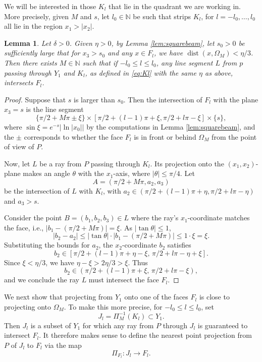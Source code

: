 \documentclass[11pt]{amsart}
\newtheorem{lemma}[theorem]{Lemma}
\numberwithin{equation}{section}
\theoremstyle{definition}
\theoremstyle{definition}
\theoremstyle{definition}
\newcommand{\N}{\mathbb{N}}
\begin{document}
We will be interested in those $K_l$ that lie in the quadrant we are working in. More precisely, given $M$ and $s$, let $l_0 \in \N$ be such that strips $K_l$, for $l=-l_0,\ldots, l_0$ all lie in the region $x_1 > |x_2|$.

\begin{lemma}\label{intersection-lemma}
Let $\delta>0$. Given $\eta>0$, by Lemma \ref{lem:squarebeam}, let $s_0>0$ be sufficiently large that for $x_3>s_0$ and any $x\in F_l$, we have $\operatorname{dist}(x,\Omega_M) < \eta/3$. Then there exists $M\in \N$ such that if $-l_0 \leq l \leq l_0$, any line segment $L$ from $p$ passing through $Y_1$ and $K_l$, as defined in \eqref{eq:Kl} with the same $\eta$ as above, intersects $F_l$.
\end{lemma}

\begin{proof}
Suppose that $s$ is larger than $s_0$. Then the intersection of $F_l$ with the plane $x_3 = s$ is the line segment
\[
\{\pi/2 + M\pi \pm \xi\} \times [\pi/2 + (l-1)\pi + \xi, \pi/2 + l\pi - \xi] \times \{s\},
\]
where $\sin \xi = e^{-s} |\ln |x_0||$ by the computations in Lemma \ref{lem:squarebeam}, and the $\pm$ corresponds to whether the face $F_l$ is in front or behind $\Omega_M$ from the point of view of $P$.

Now, let $L$ be a ray from $P$ passing through $K_l$. Its projection onto the $(x_1,x_2)$-plane makes an angle $\theta$ with  the $x_1$-axis, where $|\theta| \le \pi/4$. Let
\[
A = (\pi/2 + M\pi , a_2, a_3)
\]
be the intersection of $L$ with $K_l$, with $a_2 \in (\pi/2 + (l-1)\pi + \eta, \pi/2 + l\pi - \eta)$ and $a_3 > s$.

Consider the point $B = (b_1, b_2, b_3) \in L$ where the ray's $x_1$-coordinate matches the face, i.e., $|b_1 - (\pi/2 + M\pi)| = \xi$. As $|\tan \theta| \le 1$,
\[
|b_2 - a_2| \le |\tan \theta| \cdot |b_1 - (\pi/2 + M\pi)| \le 1 \cdot \xi = \xi.
\]
Substituting the bounds for $a_2$, the $x_2$-coordinate $b_2$ satisfies
\[
b_2 \in [\pi/2 + (l-1)\pi + \eta - \xi, \, \pi/2 + l\pi - \eta + \xi].
\]
Since $\xi < \eta/3$, we have $\eta - \xi > 2\eta/3 > \xi$. Thus
\[
b_2 \in (\pi/2 + (l-1)\pi + \xi, \, \pi/2 + l\pi - \xi),
\]
and we conclude the ray $L$ must intersect the face $F_l$.
\end{proof}

We next show that projecting from $Y_1$ onto one of the faces $F_l$ is close to projecting onto $\Omega_M$. To make this more precise, for $-l_0 \leq l \leq l_0$, set
\[ J_l = \Pi_{M}^{-1} ( K_l  ) \subset Y_1 .\]
Then $J_l$ is a subset of $Y_1$ for which any ray from $P$ through $J_l$ is guaranteed to intersect $F_l$. It therefore makes sense to define the nearest point projection from $P$ of $J_l$ to $F_l$ via the map
\[ \Pi_{F_l} : J_l \to F_l.\]     
\end{document}
